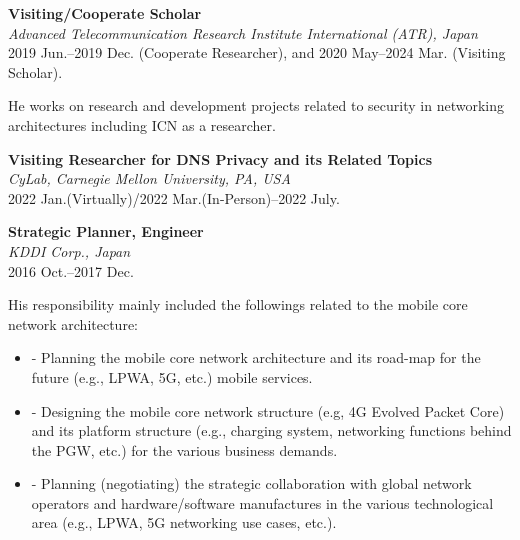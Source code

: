 \textbf{Visiting/Cooperate Scholar}\\
\hspace*{4ex}\textit{Advanced Telecommunication Research Institute International (ATR), Japan}\\
\hspace*{4ex}2019 Jun.--2019 Dec. (Cooperate Researcher), and 2020 May--2024 Mar. (Visiting Scholar).

\hspace*{4ex} He works on research and development projects related to security in networking architectures including ICN as a researcher.
\vspace*{2ex}

\textbf{Visiting Researcher for DNS Privacy and its Related Topics}\\
\hspace*{4ex}\textit{CyLab, Carnegie Mellon University, PA, USA}\\
\hspace*{4ex} 2022 Jan.(Virtually)/2022 Mar.(In-Person)--2022 July.
\vspace{1ex}

\textbf{Strategic Planner, Engineer}\\
\hspace*{4ex}\textit{KDDI Corp., Japan}\\
\hspace*{4ex}2016 Oct.--2017 Dec.

\hspace*{4ex} His responsibility mainly included the followings related to the mobile core network architecture:
\begin{itemize}
  \item \hspace*{4ex}
    \begin{minipage}{0.9\linewidth}
      - Planning the mobile core network architecture and its road-map for the future (e.g., LPWA, 5G, etc.) mobile services.
    \end{minipage}
  \item \hspace*{4ex}
    \begin{minipage}{0.9\linewidth}
      - Designing the mobile core network structure (e.g, 4G Evolved Packet Core) and its platform structure (e.g., charging system, networking functions behind the PGW, etc.) for the various business demands.
    \end{minipage}
  \item \hspace*{4ex}
    \begin{minipage}{0.9\linewidth}
      - Planning (negotiating) the strategic collaboration with global network operators and hardware/software manufactures in the various technological area (e.g., LPWA, 5G networking use cases, etc.).
    \end{minipage}
\end{itemize}
\vspace*{2ex}

